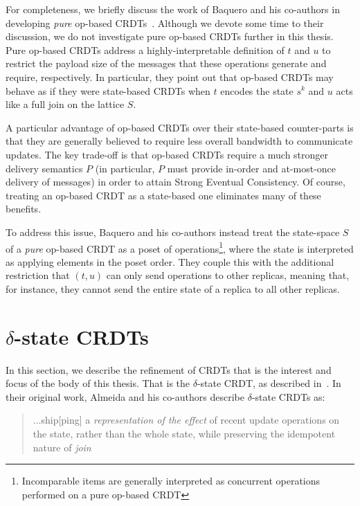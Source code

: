 For completeness, we briefly discuss the work of Baquero and his co-authors in
developing \emph{pure} op-based CRDTs~\citep{baquero17}. Although we devote some
time to their discussion, we do not investigate pure op-based CRDTs further in
this thesis. Pure op-based CRDTs address a highly-interpretable definition of
$t$ and $u$ to restrict the payload size of the messages that these operations
generate and require, respectively. In particular, they point out that op-based
CRDTs may behave as if they were state-based CRDTs when $t$ encodes the state
$s^k$ and $u$ acts like a full join on the lattice $S$.

A particular advantage of op-based CRDTs over their state-based counter-parts is
that they are generally believed to require less overall bandwidth to
communicate updates. The key trade-off is that op-based CRDTs require a much
stronger delivery semantics $P$ (in particular, $P$ must provide in-order and
at-most-once delivery of messages) in order to attain Strong Eventual
Consistency. Of course, treating an op-based CRDT as a state-based one
eliminates many of these benefits.

To address this issue, Baquero and his co-authors instead treat the state-space
$S$ of a \emph{pure} op-based CRDT as a poset of
operations\footnote{Incomparable items are generally interpreted as concurrent
operations performed on a pure op-based CRDT}, where the state is interpreted as
applying elements in the poset order. They couple this with the additional
restriction that $(t,u)$ can only send operations to other replicas, meaning
that, for instance, they cannot send the entire state of a replica to all other
replicas.

\section{$\delta$-state CRDTs}
In this section, we describe the refinement of CRDTs that is the interest and
focus of the body of this thesis. That is the $\delta$-state CRDT, as described
in~\citep{almedia18}. In their original work, Almeida and his co-authors
describe $\delta$-state CRDTs as:
\begin{quote}
...ship[ping] a \textit{representation of the effect} of recent update operations
on the state, rather than the whole state, while preserving the idempotent
nature of \textit{join}
\end{quote}


